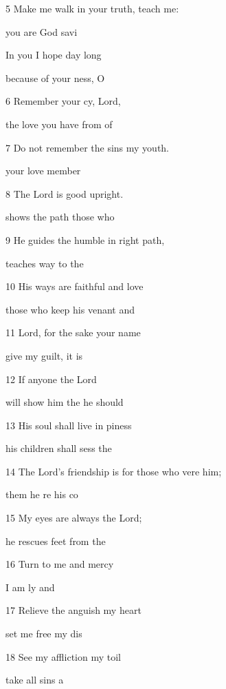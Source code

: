 5 Make me walk in your truth,  teach me: 

 you are God  savi 

In you I hope  day long 

 because of your ness, O  

6 Remember your cy, Lord, 

 the love you have  from of  

7 Do not remember the sins  my youth. 

 your love member  

8 The Lord is good  upright. 

 shows the path  those who  

9 He guides the humble in  right path, 

 teaches  way to the  

10 His ways are faithful and love 

 those who keep his venant and  

11 Lord, for the sake  your name 

give my guilt,  it is  

12 If anyone  the Lord 

 will show him the  he should  

13 His soul shall live in piness 

 his children shall sess the  

14 The Lord's friendship is for those who vere him; 

 them he re his co 

15 My eyes are always  the Lord; 

 he rescues  feet from the  

16 Turn to me and  mercy 

 I am ly and  

17 Relieve the anguish  my heart 

 set me free  my dis 

18 See my affliction  my toil 

 take all  sins a 

